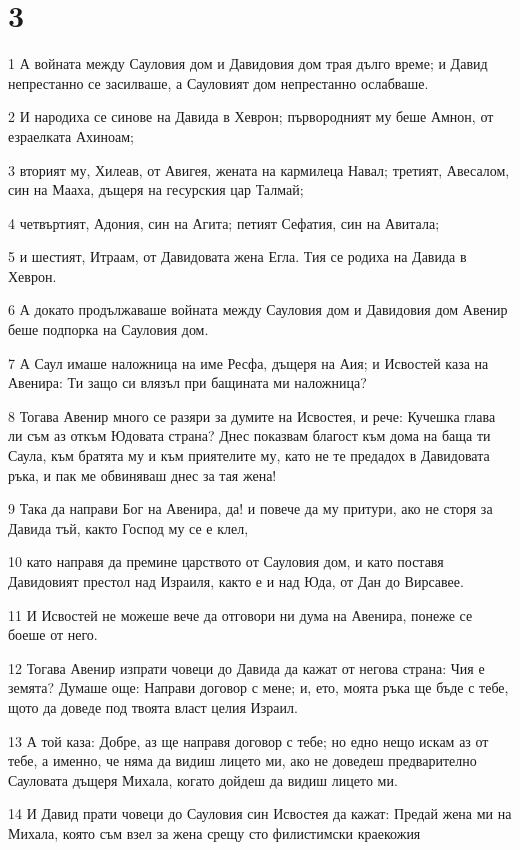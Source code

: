 \chapter{3}

\par 1 А войната между Сауловия дом и Давидовия дом трая дълго време; и Давид непрестанно се засилваше, а Сауловият дом непрестанно ослабваше.
\par 2 И народиха се синове на Давида в Хеврон; първородният му беше Амнон, от езраелката Ахиноам;
\par 3 вторият му, Хилеав, от Авигея, жената на кармилеца Навал; третият, Авесалом, син на Мааха, дъщеря на гесурския цар Талмай;
\par 4 четвъртият, Адония, син на Агита; петият Сефатия, син на Авитала;
\par 5 и шестият, Итраам, от Давидовата жена Егла. Тия се родиха на Давида в Хеврон.
\par 6 А докато продължаваше войната между Сауловия дом и Давидовия дом Авенир беше подпорка на Сауловия дом.
\par 7 А Саул имаше наложница на име Ресфа, дъщеря на Аия; и Исвостей каза на Авенира: Ти защо си влязъл при бащината ми наложница?
\par 8 Тогава Авенир много се разяри за думите на Исвостея, и рече: Кучешка глава ли съм аз откъм Юдовата страна? Днес показвам благост към дома на баща ти Саула, към братята му и към приятелите му, като не те предадох в Давидовата ръка, и пак ме обвиняваш днес за тая жена!
\par 9 Така да направи Бог на Авенира, да! и повече да му притури, ако не сторя за Давида тъй, както Господ му се е клел,
\par 10 като направя да премине царството от Сауловия дом, и като поставя Давидовият престол над Израиля, както е и над Юда, от Дан до Вирсавее.
\par 11 И Исвостей не можеше вече да отговори ни дума на Авенира, понеже се боеше от него.
\par 12 Тогава Авенир изпрати човеци до Давида да кажат от негова страна: Чия е земята? Думаше още: Направи договор с мене; и, ето, моята ръка ще бъде с тебе, щото да доведе под твоята власт целия Израил.
\par 13 А той каза: Добре, аз ще направя договор с тебе; но едно нещо искам аз от тебе, а именно, че няма да видиш лицето ми, ако не доведеш предварително Сауловата дъщеря Михала, когато дойдеш да видиш лицето ми.
\par 14 И Давид прати човеци до Сауловия син Исвостея да кажат: Предай жена ми на Михала, която съм взел за жена срещу сто филистимски краекожия
